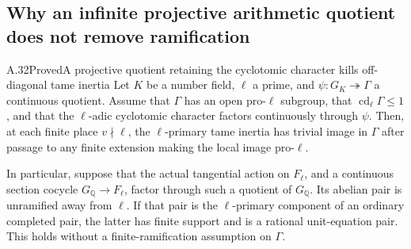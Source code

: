 \subsection{Why an infinite projective arithmetic quotient does not remove ramification}

\begin{result}{A.32}{Proved}{A projective quotient retaining the cyclotomic character kills off-diagonal tame inertia}
Let \(K\) be a number field, \(\ell\) a prime, and
\(\psi:G_K\twoheadrightarrow\Gamma\) a continuous quotient.
Assume that \(\Gamma\) has an open pro-\(\ell\) subgroup,
that \(\operatorname{cd}_\ell\Gamma\leq1\), and that the
\(\ell\)-adic cyclotomic character factors continuously through
\(\psi\). Then, at each finite place \(v\nmid\ell\), the
\(\ell\)-primary tame inertia has trivial image in \(\Gamma\)
after passage to any finite extension making the local image
pro-\(\ell\).

In particular, suppose that the actual tangential action on
\(F_\ell\), and a continuous section cocycle
\(G_{\mathbb Q}\to F_\ell\), factor through such a quotient of
\(G_{\mathbb Q}\). Its abelian pair is unramified away from
\(\ell\). If that pair is the \(\ell\)-primary component of an
ordinary completed pair, the latter has finite support and is a
rational unit-equation pair. This holds without a finite-ramification
assumption on \(\Gamma\).
\end{result}
